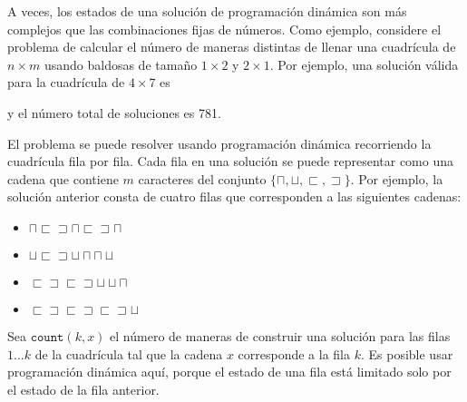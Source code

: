 A veces, los estados de una solución de programación dinámica
son más complejos que las combinaciones fijas de números.
Como ejemplo,
considere el problema de calcular
el número de maneras distintas de
llenar una cuadrícula de $n \times m$ usando
baldosas de tamaño $1 \times 2$ y $2 \times 1$.
Por ejemplo, una solución válida
para la cuadrícula de $4 \times 7$ es
\begin{center}
\end{center}
y el número total de soluciones es 781.

El problema se puede resolver usando programación dinámica
recorriendo la cuadrícula fila por fila.
Cada fila en una solución se puede representar como una
cadena que contiene $m$ caracteres del conjunto
$\{\sqcap, \sqcup, \sqsubset, \sqsupset \}$.
Por ejemplo, la solución anterior consta de cuatro filas
que corresponden a las siguientes cadenas:
\begin{itemize}
\item
$\sqcap \sqsubset \sqsupset \sqcap \sqsubset \sqsupset \sqcap$
\item
$\sqcup \sqsubset \sqsupset \sqcup \sqcap \sqcap \sqcup$
\item
$\sqsubset \sqsupset \sqsubset \sqsupset \sqcup \sqcup \sqcap$ 
\item
$\sqsubset \sqsupset \sqsubset \sqsupset \sqsubset \sqsupset \sqcup$
\end{itemize}

Sea $\texttt{count}(k,x)$ el número de maneras de
construir una solución para las filas $1 \ldots k$
de la cuadrícula tal que la cadena $x$ corresponde a la fila $k$.
Es posible usar programación dinámica aquí,
porque el estado de una fila está limitado
solo por el estado de la fila anterior.

